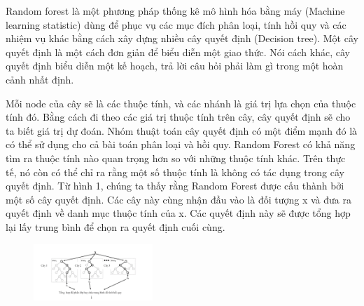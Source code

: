 Random forest là một phương pháp thống kê mô hình hóa bằng máy (Machine learning statistic) dùng để phục vụ các mục đích phân loại, tính hồi quy và các nhiệm vụ khác bằng cách xây dựng nhiều cây quyết định (Decision tree). Một cây quyết định là một cách đơn giản để biểu diễn một giao thức. Nói cách khác, cây quyết định biểu diễn một kế hoạch, trả lời câu hỏi phải làm gì trong một hoàn cảnh nhất định.

Mỗi node của cây sẽ là các thuộc tính, và các nhánh là giá trị lựa chọn của thuộc tính đó. Bằng cách đi theo các giá trị thuộc tính trên cây, cây quyết định sẽ cho ta biết giá trị dự đoán. Nhóm thuật toán cây quyết định có một điểm mạnh đó là có thể sử dụng cho cả bài toán phân loại và hồi quy. Random Forest có khả năng tìm ra thuộc tính nào quan trọng hơn so với những thuộc tính khác. Trên thực tế, nó còn có thể chỉ ra rằng một số thuộc tính là không có tác dụng trong cây quyết định. Từ hình 1, chúng ta thấy rằng Random Forest được cấu thành bởi một số cây quyết định. Các cây này cùng nhận đầu vào là đối tượng x và đưa ra quyết định về danh mục thuộc tính của x. Các quyết định này sẽ được tổng hợp lại lấy trung bình để chọn ra quyết định cuối cùng.

\begin{figure}[htbp]
\centerline{\includegraphics[width=0.4\textwidth]{img/RF.png}}
\label{fig}
\end{figure}